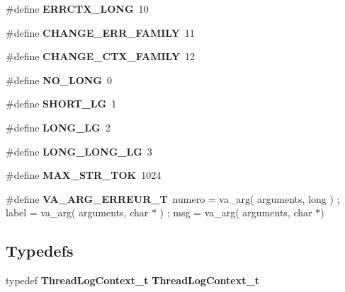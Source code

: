 \begin{CompactItemize}
\#define {\bf ERRCTX\_\-LONG}\ 10
\item 
\#define {\bf CHANGE\_\-ERR\_\-FAMILY}\ 11
\item 
\#define {\bf CHANGE\_\-CTX\_\-FAMILY}\ 12
\item 
\#define {\bf NO\_\-LONG}\ 0
\item 
\#define {\bf SHORT\_\-LG}\ 1
\item 
\#define {\bf LONG\_\-LG}\ 2
\item 
\#define {\bf LONG\_\-LONG\_\-LG}\ 3
\item 
\#define {\bf MAX\_\-STR\_\-TOK}\ 1024
\item 
\#define {\bf VA\_\-ARG\_\-ERREUR\_\-T}\ numero = va\_\-arg( arguments, long ) ; label  = va\_\-arg( arguments, char $\ast$ ) ; msg    = va\_\-arg( arguments, char $\ast$)
\end{CompactItemize}
\subsection*{Typedefs}
\begin{CompactItemize}
\item 
typedef {\bf Thread\-Log\-Context\_\-t} {\bf Thread\-Log\-Context\_\-t}
\end{CompactItemize}
